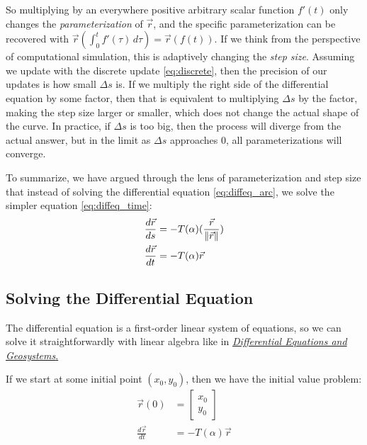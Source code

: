 \documentclass[11pt, oneside]{article}
\begin{document}
So multiplying by an everywhere positive arbitrary scalar function \( f'(t) \)
only changes the \emph{parameterization} of \( \vec{r} \), and the specific
parameterization can be recovered with \( \vec{r}(\int^t_0 f'(\tau) \, d\tau) =
\vec{r}(f(t)) \). If we think from the perspective of computational simulation,
this is adaptively changing the \emph{step size}. Assuming we update with the
discrete update \eqref{eq:discrete}, then the precision of our updates is how
small \( \Delta s \) is. If we multiply the right side of the differential
equation by some factor, then that is equivalent to multiplying \( \Delta s \)
by the factor, making the step size larger or smaller, which does not change
the actual shape of the curve. In practice, if \( \Delta s \) is too big, then
the process will diverge from the actual answer, but in the limit as \( \Delta
s \) approaches 0, all parameterizations will converge.

To summarize, we have argued through the lens of parameterization
and step size that instead of solving the differential equation
\eqref{eq:diffeq_arc}, we solve the simpler equation \eqref{eq:diffeq_time}:
\begin{align*}
  \frac{d \vec{r}}{ds} &= -T(\alpha) (\frac{\vec{r}}{\norm{\vec{r}}}) \\
  \frac{d \vec{r}}{dt} &= -T(\alpha) \vec{r}
\end{align*}

\subsection{Solving the Differential Equation}

The differential equation is a first-order linear system of equations,
so we can solve it straightforwardly with linear algebra like in
\href{https://stephen-huan.github.io/assets/pdfs/cs-lectures/math/diffy-geosystems/geosystems.pdf}{\textit{Differential Equations and Geosystems}.}

If we start at some initial point \( (x_0, y_0)
\), then we have the initial value problem:
\begin{align*}
  \vec{r}(0) &= \begin{bmatrix} x_0 \\ y_0 \end{bmatrix} \\
\frac{d \vec{r}}{dt} &= -T(\alpha) \vec{r}
\end{align*}
\end{document}
